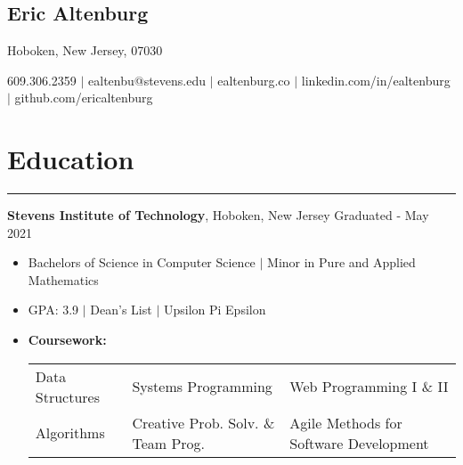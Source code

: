 \documentclass[10pt]{article}
\newcommand{\name}[1]{\begin{center}\section*{\huge #1}\end{center}}
\newcommand{\topinfo}[1]{\begin{center}\vspace{-0.15cm}#1\vspace{-0.15cm}\end{center}}
\newcommand{\resumesection}[1]{\vspace{-0.2cm}\section*{#1}\vspace{-0.2cm}\hrule\vspace{0.2cm}}
\begin{document}
\name{Eric Altenburg}
\topinfo{Hoboken, New Jersey, 07030}
\vspace{-0.1cm}
\topinfo{609.306.2359 $\vert$ ealtenbu@stevens.edu $\vert$ ealtenburg.co $\vert$ linkedin.com/in/ealtenburg $\vert$ github.com/ericaltenburg}








\vspace{-0.15cm}
\resumesection{Education}
\textbf{Stevens Institute of Technology}, Hoboken, New Jersey \hfill Graduated - May 2021
\begin{itemize}
	\item[] Bachelors of Science in Computer Science $\vert$ Minor in Pure and Applied Mathematics
	\item[] GPA: 3.9 $\vert$ Dean's List $\vert$ Upsilon Pi Epsilon 
	\item[] \textbf{Coursework:}
	\setlength\tabcolsep{6 pt}
			\begin{tabular}[t]{l l l}
				Data Structures & Systems Programming & Web Programming I \& II\\ %
				Algorithms & Creative Prob. Solv. \& Team Prog. & Agile Methods for Software Development
			\end{tabular}

\end{itemize}
\end{document}
